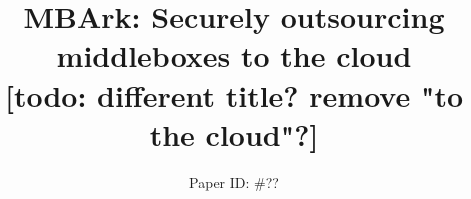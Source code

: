 \documentclass{sig-alternate}
\newcommand{\sys}{MBArk\xspace}
\newcommand{\todo}[1]{{\color{Red} [todo: {#1}]}}
\begin{document}
%

\title{\sys: Securely outsourcing middleboxes to the cloud \\
{\small \todo{ different title? remove "to the cloud"?}}
}
\subtitle{Paper ID: \#??}


%
%
%
%
%
\end{document}
